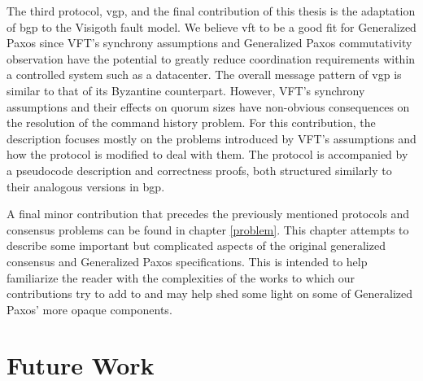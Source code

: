 The third protocol, \acrlong{vgp}, and the final contribution of this thesis is the adaptation of \acrshort{bgp} to the Visigoth fault model. We believe \acrshort{vft} to be a good fit for Generalized Paxos since VFT's synchrony assumptions and Generalized Paxos commutativity observation have the potential to greatly reduce coordination requirements within a controlled system such as a datacenter. The overall message pattern of \acrshort{vgp} is similar to that of its Byzantine counterpart. However, VFT's synchrony assumptions and their effects on quorum sizes have non-obvious consequences on the resolution of the command history problem. For this contribution, the description focuses mostly on the problems introduced by VFT's assumptions and how the protocol is modified to deal with them. The protocol is accompanied by a pseudocode description and correctness proofs, both structured similarly to their analogous versions in \acrshort{bgp}. \par
A final minor contribution that precedes the previously mentioned protocols and consensus problems can be found in chapter \ref{problem}. This chapter attempts to describe some important but complicated aspects of the original generalized consensus and Generalized Paxos specifications. This is intended to help familiarize the reader with the complexities of the works to which our contributions try to add to and may help shed some light on some of Generalized Paxos' more opaque components.

\section{Future Work}

